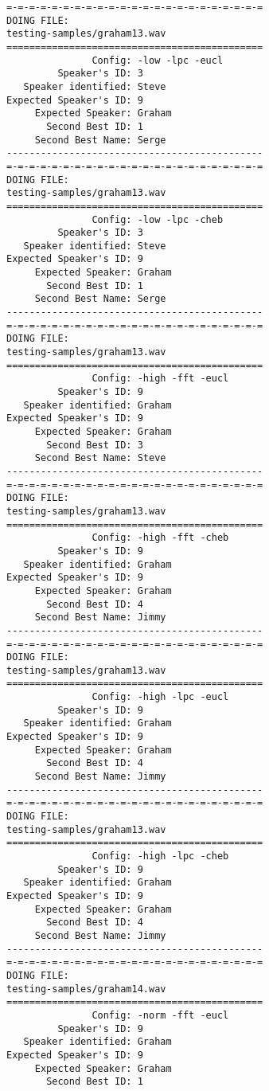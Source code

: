 \begin{verbatim}
=-=-=-=-=-=-=-=-=-=-=-=-=-=-=-=-=-=-=-=-=-=-=
DOING FILE:
testing-samples/graham13.wav
=============================================
               Config: -low -lpc -eucl
         Speaker's ID: 3
   Speaker identified: Steve
Expected Speaker's ID: 9
     Expected Speaker: Graham
       Second Best ID: 1
     Second Best Name: Serge
---------------------------------------------
=-=-=-=-=-=-=-=-=-=-=-=-=-=-=-=-=-=-=-=-=-=-=
DOING FILE:
testing-samples/graham13.wav
=============================================
               Config: -low -lpc -cheb
         Speaker's ID: 3
   Speaker identified: Steve
Expected Speaker's ID: 9
     Expected Speaker: Graham
       Second Best ID: 1
     Second Best Name: Serge
---------------------------------------------
=-=-=-=-=-=-=-=-=-=-=-=-=-=-=-=-=-=-=-=-=-=-=
DOING FILE:
testing-samples/graham13.wav
=============================================
               Config: -high -fft -eucl
         Speaker's ID: 9
   Speaker identified: Graham
Expected Speaker's ID: 9
     Expected Speaker: Graham
       Second Best ID: 3
     Second Best Name: Steve
---------------------------------------------
=-=-=-=-=-=-=-=-=-=-=-=-=-=-=-=-=-=-=-=-=-=-=
DOING FILE:
testing-samples/graham13.wav
=============================================
               Config: -high -fft -cheb
         Speaker's ID: 9
   Speaker identified: Graham
Expected Speaker's ID: 9
     Expected Speaker: Graham
       Second Best ID: 4
     Second Best Name: Jimmy
---------------------------------------------
=-=-=-=-=-=-=-=-=-=-=-=-=-=-=-=-=-=-=-=-=-=-=
DOING FILE:
testing-samples/graham13.wav
=============================================
               Config: -high -lpc -eucl
         Speaker's ID: 9
   Speaker identified: Graham
Expected Speaker's ID: 9
     Expected Speaker: Graham
       Second Best ID: 4
     Second Best Name: Jimmy
---------------------------------------------
=-=-=-=-=-=-=-=-=-=-=-=-=-=-=-=-=-=-=-=-=-=-=
DOING FILE:
testing-samples/graham13.wav
=============================================
               Config: -high -lpc -cheb
         Speaker's ID: 9
   Speaker identified: Graham
Expected Speaker's ID: 9
     Expected Speaker: Graham
       Second Best ID: 4
     Second Best Name: Jimmy
---------------------------------------------
=-=-=-=-=-=-=-=-=-=-=-=-=-=-=-=-=-=-=-=-=-=-=
DOING FILE:
testing-samples/graham14.wav
=============================================
               Config: -norm -fft -eucl
         Speaker's ID: 9
   Speaker identified: Graham
Expected Speaker's ID: 9
     Expected Speaker: Graham
       Second Best ID: 1

\end{verbatim}
